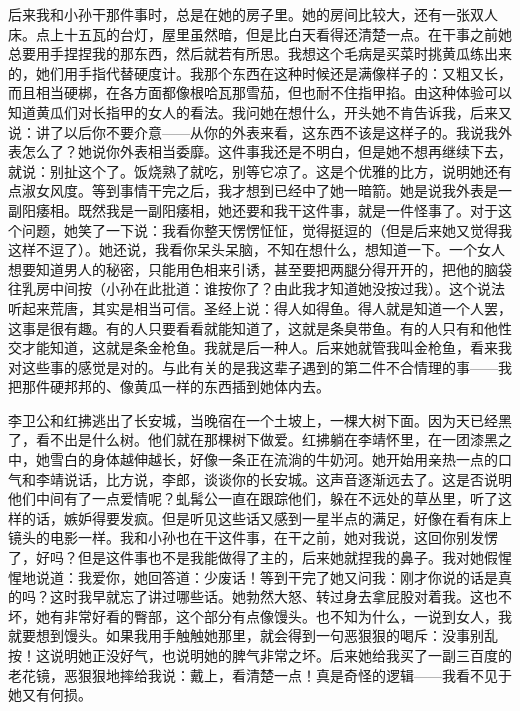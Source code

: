 后来我和小孙干那件事时，总是在她的房子里。她的房间比较大，还有一张双人床。点上十五瓦的台灯，屋里虽然暗，但是比白天看得还清楚一点。在干事之前她总要用手捏捏我的那东西，然后就若有所思。我想这个毛病是买菜时挑黄瓜练出来的，她们用手指代替硬度计。我那个东西在这种时候还是满像样子的：又粗又长，而且相当硬梆，在各方面都像根哈瓦那雪茄，但也耐不住指甲掐。由这种体验可以知道黄瓜们对长指甲的女人的看法。我问她在想什么，开头她不肯告诉我，后来又说：讲了以后你不要介意——从你的外表来看，这东西不该是这样子的。我说我外表怎么了？她说你外表相当委靡。这件事我还是不明白，但是她不想再继续下去，就说：别扯这个了。饭烧熟了就吃，别等它凉了。这是个优雅的比方，说明她还有点淑女风度。等到事情干完之后，我才想到已经中了她一暗箭。她是说我外表是一副阳痿相。既然我是一副阳痿相，她还要和我干这件事，就是一件怪事了。对于这个问题，她笑了一下说：我看你整天愣愣怔怔，觉得挺逗的（但是后来她又觉得我这样不逗了）。她还说，我看你呆头呆脑，不知在想什么，想知道一下。一个女人想要知道男人的秘密，只能用色相来引诱，甚至要把两腿分得开开的，把他的脑袋往乳房中间按（小孙在此批道：谁按你了？由此我才知道她没按过我）。这个说法听起来荒唐，其实是相当可信。圣经上说：得人如得鱼。得人就是知道一个人罢，这事是很有趣。有的人只要看看就能知道了，这就是条臭带鱼。有的人只有和他性交才能知道，这就是条金枪鱼。我就是后一种人。后来她就管我叫金枪鱼，看来我对这些事的感觉是对的。与此有关的是我这辈子遇到的第二件不合情理的事——我把那件硬邦邦的、像黄瓜一样的东西插到她体内去。 

李卫公和红拂逃出了长安城，当晚宿在一个土坡上，一棵大树下面。因为天已经黑了，看不出是什么树。他们就在那棵树下做爱。红拂躺在李靖怀里，在一团漆黑之中，她雪白的身体越伸越长，好像一条正在流淌的牛奶河。她开始用亲热一点的口气和李靖说话，比方说，李郎，谈谈你的长安城。这声音逐渐远去了。这是否说明他们中间有了一点爱情呢？虬髯公一直在跟踪他们，躲在不远处的草丛里，听了这样的话，嫉妒得要发疯。但是听见这些话又感到一星半点的满足，好像在看有床上镜头的电影一样。我和小孙也在干这件事，在干之前，她对我说，这回你别发愣了，好吗？但是这件事也不是我能做得了主的，后来她就捏我的鼻子。我对她假惺惺地说道：我爱你，她回答道：少废话！等到干完了她又问我：刚才你说的话是真的吗？这时我早就忘了讲过哪些话。她勃然大怒、转过身去拿屁股对着我。这也不坏，她有非常好看的臀部，这个部分有点像馒头。也不知为什么，一说到女人，我就要想到馒头。如果我用手触触她那里，就会得到一句恶狠狠的喝斥：没事别乱按！这说明她正没好气，也说明她的脾气非常之坏。后来她给我买了一副三百度的老花镜，恶狠狠地摔给我说：戴上，看清楚一点！真是奇怪的逻辑——我看不见于她又有何损。 

